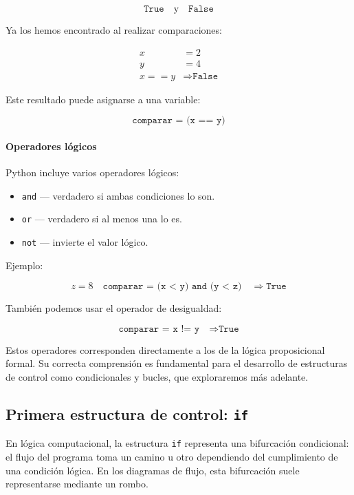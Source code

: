 \documentclass{article}
\theoremstyle{nonumberplain}
\begin{document}
\[
\texttt{True} \quad \text{y} \quad \texttt{False}
\]

Ya los hemos encontrado al realizar comparaciones:

\[
\begin{aligned}
x &= 2 \\
y &= 4 \\
x == y &\Rightarrow \texttt{False}
\end{aligned}
\]

Este resultado puede asignarse a una variable:

\[
\texttt{comparar = (x == y)}
\]



\paragraph{Operadores lógicos}

Python incluye varios operadores lógicos:

\begin{itemize}
    \item \texttt{and} — verdadero si ambas condiciones lo son.
    \item \texttt{or} — verdadero si al menos una lo es.
    \item \texttt{not} — invierte el valor lógico.
\end{itemize}

Ejemplo:

\[
z = 8 \quad \texttt{comparar = (x < y) and (y < z)} \quad \Rightarrow \texttt{True}
\]

También podemos usar el operador de desigualdad:

\[
\texttt{comparar = x != y} \quad \Rightarrow \texttt{True}
\]

Estos operadores corresponden directamente a los de la lógica proposicional formal. Su correcta comprensión es fundamental para el desarrollo de estructuras de control como condicionales y bucles, que exploraremos más adelante.

\subsection*{Primera estructura de control: \texttt{if}}

En lógica computacional, la estructura \texttt{if} representa una bifurcación condicional: el flujo del programa toma un camino u otro dependiendo del cumplimiento de una condición lógica. En los diagramas de flujo, esta bifurcación suele representarse mediante un rombo.
\end{document}
